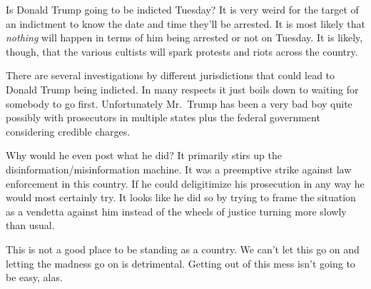 Is Donald Trump going to be indicted Tuesday? It is very weird for the
target of an indictment to know the date and time they'll be arrested.
It is most likely that \emph{nothing} will happen in terms of him being
arrested or not on Tuesday. It is likely, though, that the various
cultists will spark protests and riots across the country.

There are several investigations by different jurisdictions that could
lead to Donald Trump being indicted. In many respects it just boils down
to waiting for somebody to go first. Unfortunately Mr.~Trump has been a
very bad boy quite possibly with prosecutors in multiple states plus the
federal government considering credible charges.

Why would he even post what he did? It primarily stirs up the
disinformation/misinformation machine. It was a preemptive strike
against law enforcement in this country. If he could deligitimize his
prosecution in any way he would most certainly try. It looks like he did
so by trying to frame the situation as a vendetta against him instead of
the wheels of justice turning more slowly than usual.

This is not a good place to be standing as a country. We can't let this
go on and letting the madness go on is detrimental. Getting out of this
mess isn't going to be easy, alas.
